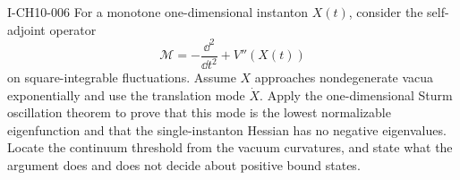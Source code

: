 \begin{exercise}{I-CH10-006}
For a monotone one-dimensional instanton $X(t)$, consider the self-adjoint
operator
\[
  \mathcal M=-\frac{\dd^2}{\dd t^2}+V''(X(t))
\]
on square-integrable fluctuations.  Assume $X$ approaches nondegenerate vacua
exponentially and use the translation mode $\dot X$.  Apply the one-dimensional
Sturm oscillation theorem to prove that this mode is the lowest normalizable
eigenfunction and that the single-instanton Hessian has no negative
eigenvalues.  Locate the continuum threshold from the vacuum curvatures, and
state what the argument does and does not decide about positive bound states.
\end{exercise}
